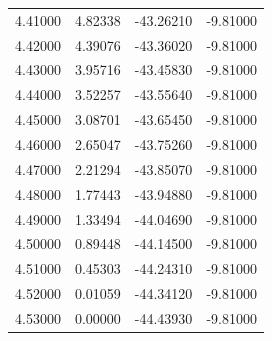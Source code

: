 \begin{table}
\begin{tabular}{llll}
4.41000 & 4.82338 & -43.26210 & -9.81000 \\
4.42000 & 4.39076 & -43.36020 & -9.81000 \\
4.43000 & 3.95716 & -43.45830 & -9.81000 \\
4.44000 & 3.52257 & -43.55640 & -9.81000 \\
4.45000 & 3.08701 & -43.65450 & -9.81000 \\
4.46000 & 2.65047 & -43.75260 & -9.81000 \\
4.47000 & 2.21294 & -43.85070 & -9.81000 \\
4.48000 & 1.77443 & -43.94880 & -9.81000 \\
4.49000 & 1.33494 & -44.04690 & -9.81000 \\
4.50000 & 0.89448 & -44.14500 & -9.81000 \\
4.51000 & 0.45303 & -44.24310 & -9.81000 \\
4.52000 & 0.01059 & -44.34120 & -9.81000 \\
4.53000 & 0.00000 & -44.43930 & -9.81000 \\
\bottomrule
\end{tabular}
\end{table}
